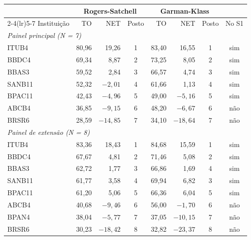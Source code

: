 \begin{tabular}{lrrcrrcc}
\toprule
 & \multicolumn{3}{c}{Rogers-Satchell} & \multicolumn{3}{c}{Garman-Klass} & \\
\cmidrule(lr){2-4}\cmidrule(lr){5-7}
Instituição & TO & NET & Posto & TO & NET & Posto & No S1 \\
\midrule
\multicolumn{8}{l}{\textit{Painel principal (N = 7)}} \\
ITUB4 & 80,96 & 19,26 & 1 & 83,40 & 16,55 & 1 & sim \\
BBDC4 & 69,34 & 8,87 & 2 & 73,25 & 8,05 & 2 & sim \\
BBAS3 & 59,52 & 2,84 & 3 & 66,57 & 4,74 & 3 & sim \\
SANB11 & 52,32 & $-2{,}01$ & 4 & 61,66 & 1,13 & 4 & sim \\
BPAC11 & 42,43 & $-4{,}96$ & 5 & 49,00 & $-5{,}16$ & 5 & sim \\
ABCB4 & 36,85 & $-9{,}15$ & 6 & 48,20 & $-6{,}67$ & 6 & não \\
BRSR6 & 28,59 & $-14{,}85$ & 7 & 34,10 & $-18{,}64$ & 7 & não \\
\midrule
\multicolumn{8}{l}{\textit{Painel de extensão (N = 8)}} \\
ITUB4 & 83,36 & 18,43 & 1 & 84,68 & 15,59 & 1 & sim \\
BBDC4 & 67,67 & 4,81 & 2 & 71,46 & 5,08 & 2 & sim \\
BBAS3 & 62,72 & 1,77 & 3 & 66,86 & 1,69 & 4 & sim \\
SANB11 & 61,77 & 3,58 & 4 & 69,94 & 6,82 & 3 & sim \\
BPAC11 & 61,20 & 5,06 & 5 & 66,36 & 6,04 & 5 & sim \\
ABCB4 & 40,68 & $-9{,}46$ & 6 & 56,00 & $-1{,}70$ & 6 & não \\
BPAN4 & 38,04 & $-5{,}77$ & 7 & 37,05 & $-10{,}15$ & 7 & não \\
BRSR6 & 30,23 & $-18{,}42$ & 8 & 32,82 & $-23{,}37$ & 8 & não \\
\bottomrule
\end{tabular}
